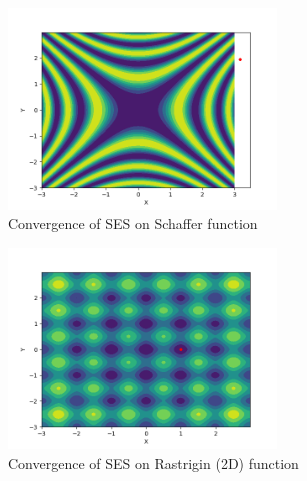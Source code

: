 \begin{figure}
  \begin{center}
  \includegraphics[width=2.8in]{./../code/test_evolution_strategy_results/test_evolution_strategy-schaffer2d-SES.png}
  \caption{Convergence of SES on Schaffer function}
  \label{img:test_evolution_strategy-schaffer-SES}
  \end{center}
\end{figure}





\begin{figure}
  \begin{center}
  \includegraphics[width=2.8in]{./../code/test_evolution_strategy_results/test_evolution_strategy-rastrigin-SES.png}
  \caption{Convergence of SES on Rastrigin (2D) function}
  \label{img:test_evolution_strategy-rastrigin-SES}
  \end{center}
\end{figure}

